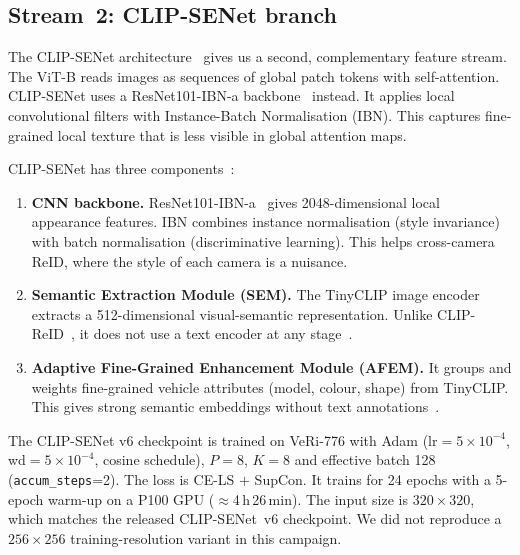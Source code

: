 \subsection{Stream~2: CLIP-SENet branch}
The CLIP-SENet architecture~\cite{lu2025clipsenet} gives us a second, complementary feature stream. The ViT-B reads images as sequences of global patch tokens with self-attention. CLIP-SENet uses a ResNet101-IBN-a backbone~\cite{pan2018ibn} instead. It applies local convolutional filters with Instance-Batch Normalisation (IBN). This captures fine-grained local texture that is less visible in global attention maps.

CLIP-SENet has three components~\cite{lu2025clipsenet}:
\begin{enumerate}
  \item \textbf{CNN backbone.} ResNet101-IBN-a~\cite{pan2018ibn} gives 2048-dimensional local appearance features. IBN combines instance normalisation (style invariance) with batch normalisation (discriminative learning). This helps cross-camera ReID, where the style of each camera is a nuisance.
  \item \textbf{Semantic Extraction Module (SEM).} The TinyCLIP image encoder extracts a 512-dimensional visual-semantic representation. Unlike CLIP-ReID~\cite{li2023clipreid}, it does not use a text encoder at any stage~\cite{lu2025clipsenet}.
  \item \textbf{Adaptive Fine-Grained Enhancement Module (AFEM).} It groups and weights fine-grained vehicle attributes (model, colour, shape) from TinyCLIP. This gives strong semantic embeddings without text annotations~\cite{lu2025clipsenet}.
\end{enumerate}

The CLIP-SENet v6 checkpoint is trained on VeRi-776 with Adam ($\mathrm{lr}\!=\!5\!\times\!10^{-4}$, wd$=\!5\!\times\!10^{-4}$, cosine schedule), $P\!=\!8$, $K\!=\!8$ and effective batch 128 (\texttt{accum\_steps}=2). The loss is CE-LS $+$ SupCon. It trains for 24 epochs with a 5-epoch warm-up on a P100 GPU ($\approx$4\,h\,26\,min). The input size is $320\!\times\!320$, which matches the released CLIP-SENet~v6 checkpoint. We did not reproduce a $256\!\times\!256$ training-resolution variant in this campaign.
